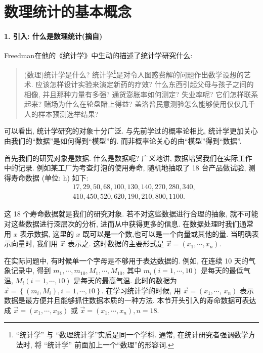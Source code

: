 \section{数理统计的基本概念}

\paragraph{1. 引入: 什么是数理统计(摘自\cite{probpku})}

Freedman在他的《统计学》中生动的描述了统计学研究什么: 
\begin{quote}
    (数理)统计学是什么? 统计学\footnote{“统计学” 与 “数理统计学”实质是同一个学科. 通常, 在统计研究者强调数学方法时, 将 “统计学” 前面加上一个“数理”的形容词.}是对令人图惑费解的问题作出数学设想的艺术. 应该怎样设计实验来演定新药的疗效? 什么东西引起父母与孩子之间的相像, 并且那种力量有多强? 通货澎胀率如何测定? 失业率呢? 它们怎样联系起来? 赌场为什么在轮盘賭上得益? 盖洛普民意测验怎么能够使用仅仅几千人的样本预测选举结果?
\end{quote}
可以看出, 统计学研究的对象十分广泛. 与先前学过的概率论相比, 统计学更加关心由我们的``数据''是如何得到``模型''的. 而非概率论关心的由``模型''得到``数据''. 

首先我们的研究对象是数据. 什么是数据呢? 广义地讲, 数据培贸我们在实际工作中的记录. 例如某工厂为考查灯泡的使用寿命, 随机地抽取了 18 台产品做试验, 测得寿命数据 (单位: h) 如下:
$$
\begin{aligned}
& 17,29,50,68,100,130,140,270,280,340, \\
& 410,450,520,620,190,210,800,1100 .
\end{aligned}
$$

这 18 个寿命数据就是我们的研究对象. 若不对这些数据进行合理的抽象, 就不可能对这些数据进行深层次的分析, 进而从中获得更多的信息. 在数据处理时我们通常用 $x$ 表示数据, 这里的 $x$ 既可以是一个数,也可以是一个向量或其他的量. 当明确表示向量时, 我们用 $\vec x$ 表示之. 这时数据的主要形式是 $\vec x=\left(x_1, \cdots, x_n\right)$.

在实际问题中, 有时候单一个字母是不够用于表达数据的. 例如, 在连续 10 天的气象记录中, 得到 $m_1, \cdots, m_{10}, M_1, \cdots, M_{10}$, 其中 $m_i(i=1, \cdots, 10)$ 是每天的最低气温, $M_i(i=1, \cdots, 10)$ 是每天的最高气温. 此时的数据为 $\vec x=\left\{\left(m_i, M_i\right), i=1, \cdots, 10\right\}$. 在学习统计学的时候, 用 $\vec x=\left(x_1, \cdots\right.$, $\left.x_n\right)$ 表示数据是最方便并且能够抓住数据本质的一种方法. 本节开头引入的寿命数据可表达成 $\vec x=\left(x_1, \cdots, x_{18}\right)$ 或 $\vec x=\left(x_1, \cdots, x_n\right), n=18$.

